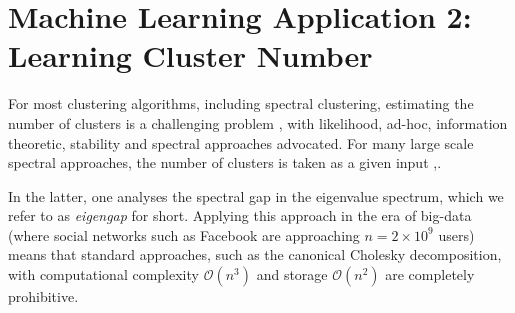 \documentclass[letterpaper]{article} %
\begin{document}
\section{Machine Learning Application 2: Learning Cluster Number}
For most clustering algorithms, including spectral clustering, estimating the number of clusters is a challenging problem \citep{von2007tutorial}, with likelihood, ad-hoc, information theoretic, stability and spectral approaches advocated. For many large scale spectral approaches, the number of clusters is taken as a given input 
\cite{liu2013large},\cite{cucuringu2016simple}. 

In the latter, one analyses the spectral gap in the eigenvalue spectrum, which we refer to as \emph{eigengap} for short. Applying this approach in the era of big-data (where social networks such as Facebook are approaching $n = 2\times 10^9$ users) means that standard approaches, such as the canonical Cholesky decomposition, with computational complexity $\mathcal{O}(n^{3})$  and storage $\mathcal{O}(n^{2})$ are completely prohibitive. 

\end{document}
